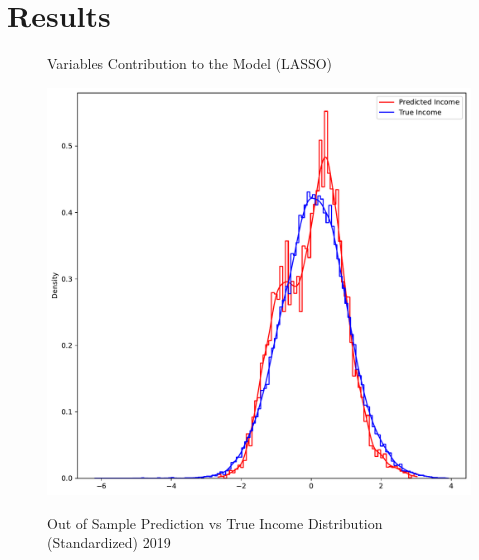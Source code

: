 \section{Results}



\begin{figure}[H]
    \centering
    \caption{Variables Contribution to the Model (LASSO)}
    \label{fig:enter-label}
\end{figure}




\begin{figure}[H]
    \centering
    \caption{Out of Sample Prediction vs True Income Distribution (Standardized) 2019}
    \includegraphics[width=1\textwidth]{../figures/fig0_prediction_vs_true_distribution_lasso_training_weighted.pdf}
    \label{fig:enter-label}
\end{figure}




